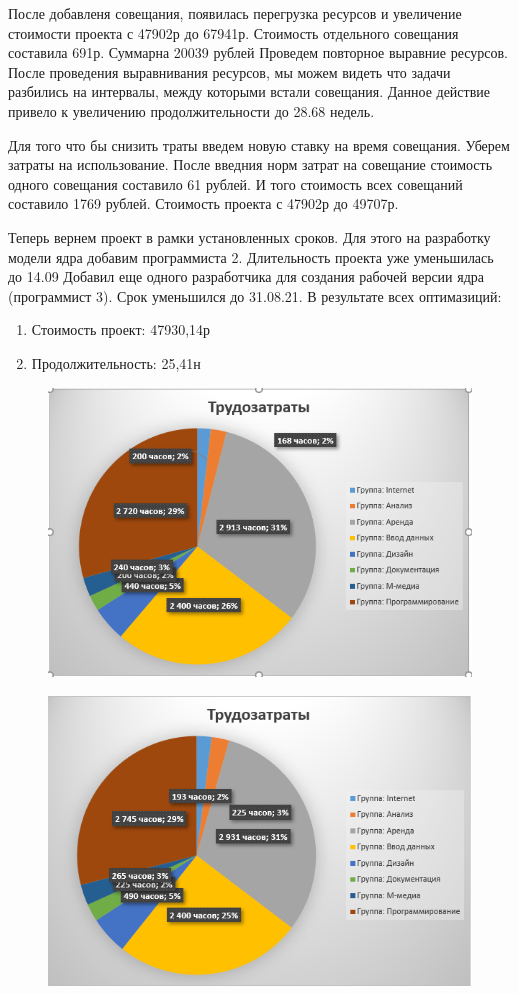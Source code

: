После добавленя совещания, появилась перегрузка ресурсов и увеличение стоимости проекта с 47902р до 67941р.
Стоимость отдельного совещания составила 691р. 
Суммарна 20039 рублей
Проведем повторное выравние ресурсов.
После проведения выравнивания ресурсов, мы можем видеть что задачи разбились на интервалы, между которыми встали совещания.
Данное действие привело к увеличению продолжительности до 28.68 недель.

Для того что бы снизить траты введем новую ставку на время совещания.
Уберем затраты на использование.
После введния норм затрат на совещание стоимость одного совещания составило 61 рублей.
И того стоимость всех совещаний составило 1769 рублей.
Стоимость проекта с 47902р до 49707р.

Теперь вернем проект в рамки установленных сроков.
Для этого на разработку модели ядра добавим программиста 2. Длительность проекта уже уменьшилась до 14.09
Добавил еще одного разработчика для создания рабочей версии ядра (программист 3). Срок уменьшился до 31.08.21.
В результате всех оптимазиций:
\begin{enumerate}
	\item Стоимость проект: 47930,14р
	\item Продолжительность: 25,41н 
\end{enumerate}

\begin{figure}[H]
	\centering
	\includegraphics[width=0.7\linewidth]{src/lab3_3_2}
	\caption{}
	\label{fig:lab332}
\end{figure}

\begin{figure}[H]
	\centering
	\includegraphics[width=0.7\linewidth]{src/lab3_3_3}
	\caption{}
	\label{fig:lab333}
\end{figure}

